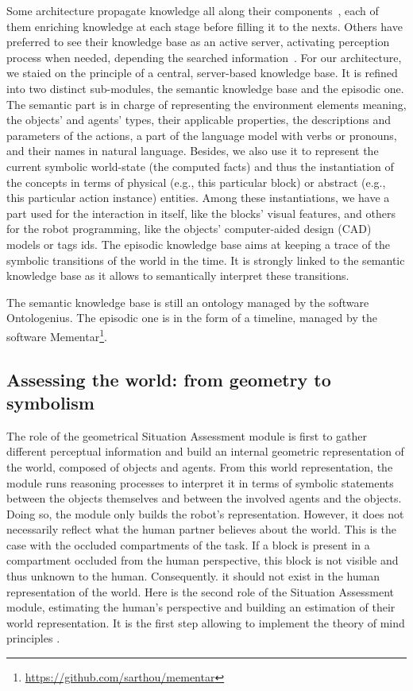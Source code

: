 Some architecture propagate knowledge all along their components~\cite{hawes_2007_balt}, each of them enriching knowledge at each stage before filling it to the nexts. Others have preferred to see their knowledge base as an active server, activating perception process when needed, depending the searched information~\cite{beetz_2018_know}. For our architecture, we staied on the principle of a central, server-based knowledge base. It is refined into two distinct sub-modules, the semantic knowledge base and the episodic one. The semantic part is in charge of representing the environment elements meaning, the objects' and agents' types, their applicable properties, the descriptions and parameters of the actions, a part of the language model with verbs or pronouns, and their names in natural language. Besides, we also use it to represent the current symbolic world-state (the computed facts) and thus the instantiation of the concepts in terms of physical (e.g., this particular block) or abstract (e.g., this particular action instance) entities. Among these instantiations, we have a part used for the interaction in itself, like the blocks' visual features, and others for the robot programming, like the objects' computer-aided design (CAD) models or tags ids. The episodic knowledge base aims at keeping a trace of the symbolic transitions of the world in the time. It is strongly linked to the semantic knowledge base as it allows to semantically interpret these transitions. 

The semantic knowledge base is still an ontology managed by the software Ontologenius. The episodic one is in the form of a timeline, managed by the software Mementar\footnote{\url{https://github.com/sarthou/mementar}}.

\subsection{Assessing the world: from geometry to symbolism}

The role of the geometrical Situation Assessment module is first to gather different perceptual information and build an internal geometric representation of the world, composed of objects and agents. From this world representation, the module runs reasoning processes to interpret it in terms of symbolic statements between the objects themselves and between the involved agents and the objects. Doing so, the module only builds the robot's representation. However, it does not necessarily reflect what the human partner believes about the world. This is the case with the occluded compartments of the task. If a block is present in a compartment occluded from the human perspective, this block is not visible and thus unknown to the human. Consequently. it should not exist in the human representation of the world. Here is the second role of the Situation Assessment module, estimating the human's perspective and building an estimation of their world representation. It is the first step allowing to implement the theory of mind principles \cite{baron_1985_does}.

